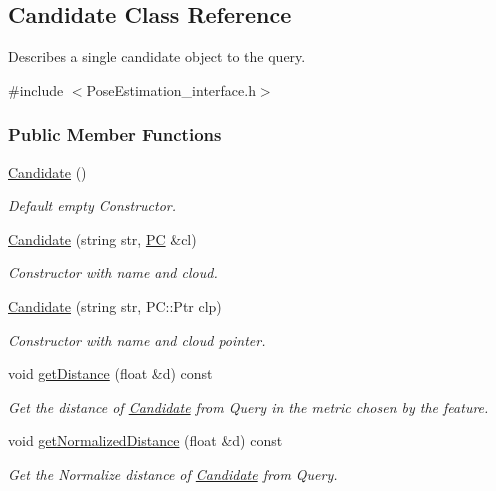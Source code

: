 \hypertarget{classCandidate}{\subsection{Candidate Class Reference}
\label{classCandidate}
}


Describes a single candidate object to the query.  




{\ttfamily \#include $<$Pose\-Estimation\-\_\-interface.\-h$>$}

\subsubsection*{Public Member Functions}
\begin{DoxyCompactItemize}
\item 
\hyperlink{classCandidate_aa2747741fb662af5e8f3d01d1d1a43b6}{Candidate} ()
\begin{DoxyCompactList}\small\item\em Default empty Constructor. \end{DoxyCompactList}\item 
\hyperlink{classCandidate_ab11f2b0e931e233a97331802dedcdae1}{Candidate} (string str, \hyperlink{group__Definitions_ga62eb21fcfa3189c5de50fb62a2a7a79e}{P\-C} \&cl)
\begin{DoxyCompactList}\small\item\em Constructor with name and cloud. \end{DoxyCompactList}\item 
\hyperlink{classCandidate_aa875b9c8439139764cf2216bf549abb2}{Candidate} (string str, P\-C\-::\-Ptr clp)
\begin{DoxyCompactList}\small\item\em Constructor with name and cloud pointer. \end{DoxyCompactList}\item 
void \hyperlink{classCandidate_a4424e1c6f6d8a739f5a0ea3b8721586f}{get\-Distance} (float \&d) const 
\begin{DoxyCompactList}\small\item\em Get the distance of \hyperlink{classCandidate}{Candidate} from Query in the metric chosen by the feature. \end{DoxyCompactList}\item 
void \hyperlink{classCandidate_aa68e39163876a510ff4b8687fdfed5bd}{get\-Normalized\-Distance} (float \&d) const 
\begin{DoxyCompactList}\small\item\em Get the Normalize distance of \hyperlink{classCandidate}{Candidate} from Query. \end{DoxyCompactList}\item 

\end{DoxyCompactItemize}
